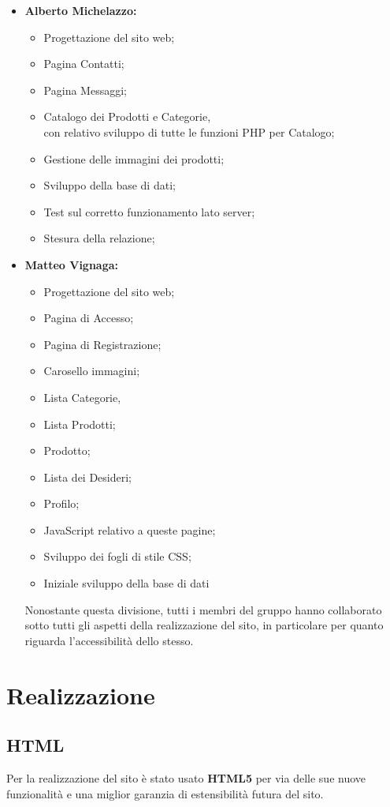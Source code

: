\documentclass[a4paper, 11pt]{article}
\begin{document}
\begin{itemize}
\item \textbf{Alberto Michelazzo:}
	\begin{itemize}
		\item Progettazione del sito web;
		\item Pagina Contatti;
		\item Pagina Messaggi;
		\item Catalogo dei Prodotti e Categorie, \\ 
		con relativo sviluppo di tutte le funzioni PHP per Catalogo;
	  	\item Gestione delle immagini dei prodotti;
		\item Sviluppo della base di dati;
		\item Test sul corretto funzionamento lato server;
		\item Stesura della relazione;
	\end{itemize}
\item \textbf{Matteo Vignaga:}
	\begin{itemize}
		\item Progettazione del sito web;
		\item Pagina di Accesso;
		\item Pagina di Registrazione;
		\item Carosello immagini;
		\item Lista Categorie,
		\item Lista Prodotti;
		\item Prodotto;
		\item Lista dei Desideri;
		\item Profilo;
		\item JavaScript relativo a queste pagine;
		\item Sviluppo dei fogli di stile CSS;
		\item Iniziale sviluppo della base di dati
	\end{itemize}

	
Nonostante questa divisione, tutti i membri del gruppo hanno collaborato sotto tutti gli aspetti della realizzazione del sito, in particolare per quanto riguarda l'accessibilità dello stesso.
\end{itemize}

\pagebreak

\section{Realizzazione}

\subsection{HTML}
Per la realizzazione del sito è stato usato \textbf{HTML5} per via delle sue nuove funzionalità e una miglior garanzia di estensibilità futura del sito.
\end{document}
